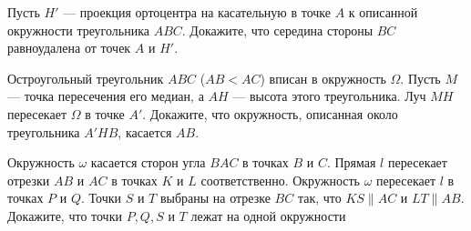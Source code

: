 \documentclass{article}
\begin{document}
\begin{enumerate_boxed}
        \item Пусть $H'$ — проекция ортоцентра на касательную в точке $A$ к описанной окружности треугольника $ABC$.
        Докажите, что середина стороны $BC$ равноудалена от точек $A$ и $H'$.

        \item Остроугольный треугольник $ABC$ ($AB < AC$) вписан в окружность $\Omega$.
        Пусть $M$ — точка пересечения его медиан, а $AH$ — высота этого треугольника.
        Луч $MH$ пересекает $\Omega$ в точке $A'$.
        Докажите, что окружность, описанная около треугольника $A'HB$,
        касается $AB$.

        \item Окружность $\omega$ касается сторон угла $BAC$ в точках $B$ и $C$.
        Прямая $l$ пересекает отрезки $AB$ и $AC$ в точках $K$ и $L$ соответственно.
        Окружность $\omega$ пересекает $l$ в точках $P$ и $Q$.
        Точки $S$ и $T$ выбраны на отрезке $BC$ так, что $KS \parallel AC$ и $LT \parallel AB$.
        Докажите, что точки $P, Q, S$ и $T$ лежат на одной окружности


    \end{enumerate_boxed}
\end{document}
